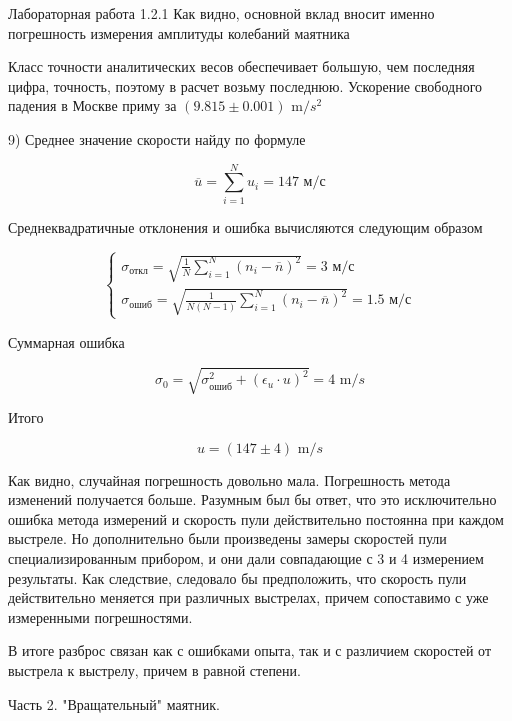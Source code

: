 \documentclass{astroedu-lab}
\begin{document}
\begin{problem}{\large Лабораторная работа 1.2.1}
Как видно, основной вклад вносит именно погрешность измерения амплитуды колебаний маятника

Класс точности аналитических весов обеспечивает большую, чем последняя цифра, точность, поэтому в расчет возьму последнюю. Ускорение свободного падения в Москве приму за $(9.815 \pm 0.001) \text{ m}/s^2$

9) Среднее значение скорости найду по формуле

\begin{equation}
\overline{u} = \sum^N_{i=1} u_i = 147 \text{ м/с}
\end{equation}

Среднеквадратичные отклонения и ошибка вычисляются следующим образом

\begin{equation}
\left\{
\begin{aligned}
\sigma_{\text{откл}} = \sqrt{\frac{1}{N} \sum^N_{i=1} \left( n_i - \overline{n} \right)^2} = 3 \text{ м/с} \\	
\sigma_{\text{ошиб}} = \sqrt{\frac{1}{N (N - 1)} \sum^N_{i=1} \left( n_i - \overline{n} \right)^2} = 1.5 \text{ м/с}
\end{aligned}
\right.
\end{equation}


Суммарная ошибка

\begin{equation}
	\sigma_0 = \sqrt{\sigma_{\text{ошиб}} ^ 2 + \left( \epsilon_u \cdot u \right) ^2} = 4 \text{ m}/s
\end{equation}

Итого

\begin{equation}
	u = (147 \pm 4) \text{ m}/s
\end{equation}


Как видно, случайная погрешность довольно мала. Погрешность метода изменений получается больше. Разумным был бы ответ, что это исключительно ошибка метода измерений и скорость пули действительно постоянна при каждом выстреле. Но дополнительно были произведены замеры скоростей пули специализированным прибором, и они дали совпадающие с 3 и 4 измерением результаты. Как следствие, следовало бы предположить, что скорость пули действительно меняется при различных выстрелах, причем сопоставимо с уже измеренными погрешностями.

В итоге разброс связан как с ошибками опыта, так и с различием скоростей от выстрела к выстрелу, причем в равной степени.

\newpage
\begin{bfseries}
	Часть 2. "Вращательный" маятник.
\end{bfseries}


\end{problem}
\end{document}
